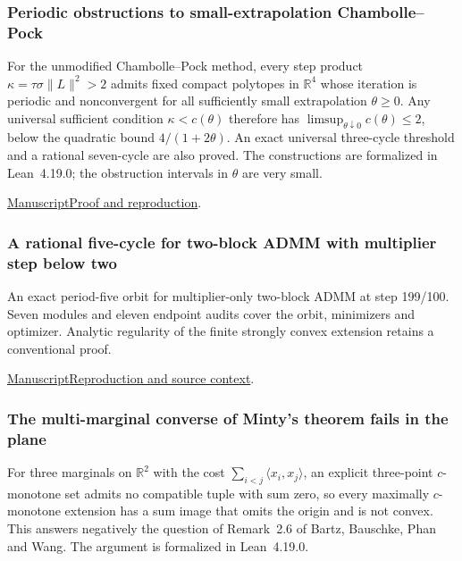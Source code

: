 \documentclass[11pt,a4paper]{article}
\begin{document}
\subsubsection{Periodic obstructions to small-extrapolation Chambolle--Pock}

For the unmodified Chambolle--Pock method, every step product $\kappa=\tau\sigma\|L\|^2>2$ admits fixed compact polytopes in $\mathbb R^4$ whose iteration is periodic and nonconvergent for all sufficiently small extrapolation $\theta\ge0$. Any universal sufficient condition $\kappa<c(\theta)$ therefore has $\limsup_{\theta\downarrow0}c(\theta)\le2$, below the quadratic bound $4/(1+2\theta)$. An exact universal three-cycle threshold and a rational seven-cycle are also proved. The constructions are formalized in Lean~4.19.0; the obstruction intervals in $\theta$ are very small.

\href{https://github.com/dvgyl/math-and-theory/blob/main/papers/mathematics/chambolle-pock-cycles/manuscript.pdf}{Manuscript}\quad\href{https://github.com/dvgyl/math-and-theory/blob/main/papers/mathematics/chambolle-pock-cycles/README.md}{Proof and reproduction}.

\subsubsection{A rational five-cycle for two-block ADMM with multiplier step below two}

An exact period-five orbit for multiplier-only two-block ADMM at step 199/100. Seven modules and eleven endpoint audits cover the orbit, minimizers and optimizer. Analytic regularity of the finite strongly convex extension retains a conventional proof.

\href{https://github.com/dvgyl/math-and-theory/blob/main/papers/mathematics/admm-counterexample/paper/admm_counterexample.pdf}{Manuscript}\quad\href{https://github.com/dvgyl/math-and-theory/blob/main/papers/mathematics/admm-counterexample/README.md}{Reproduction and source context}.

\subsubsection{The multi-marginal converse of Minty's theorem fails in the plane}

For three marginals on $\mathbb{R}^2$ with the cost $\sum_{i<j}\langle x_i,x_j\rangle$, an explicit three-point $c$-monotone set admits no compatible tuple with sum zero, so every maximally $c$-monotone extension has a sum image that omits the origin and is not convex. This answers negatively the question of Remark~2.6 of Bartz, Bauschke, Phan and Wang. The argument is formalized in Lean~4.19.0.
\end{document}
